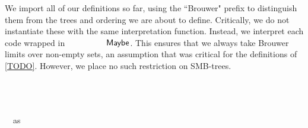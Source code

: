 We import all of our definitions so far, using the ``Brouwer" prefix to distinguish
them from the trees and ordering we are about to define.
Critically, we do not instantiate these with the same interpretation function.
Instead, we interpret each code wrapped in $\AgdaDatatype{Maybe}$.
This ensures that we always take Brouwer limits over non-empty sets,
an assumption that was critical for the definitions of \cref{TODO}.
However, we place no such restriction on SMB-trees.
\begin{code}%
\>[0]\AgdaSpace{}%
\<%
\\
\>[0][@{}l@{\AgdaIndent{0}}]%
\>[4]\<%
\\
%
\>[4]\AgdaSpace{}%
\AgdaSpace{}%
\AgdaSpace{}%
\AgdaSpace{}%
\AgdaSymbol{(}\AgdaSpace{}%
\AgdaSymbol{))}\<%
\\
%
\>[4]\AgdaSpace{}%
\AgdaSymbol{(}\AgdaSpace{}%
\AgdaSymbol{)}
\ \ as\ \<%
\end{code}


\begin{code}[hide]%
\>[0]\AgdaSpace{}%
\AgdaSpace{}%
\AgdaSpace{}%
\AgdaSpace{}%
\AgdaSpace{}%
\AgdaSpace{}%
\AgdaSpace{}%
\AgdaSpace{}%
\AgdaSymbol{(}\AgdaSpace{}%
\AgdaSymbol{))}\AgdaSpace{}%
\AgdaSpace{}%
\AgdaSymbol{(}\AgdaSpace{}%
\AgdaSymbol{)}\AgdaSpace{}%
\AgdaSpace{}%
\AgdaSpace{}%
\AgdaSpace{}%
\AgdaSymbol{)}\<%
\\
\>[0]\AgdaSpace{}%
\AgdaSpace{}%
\AgdaSpace{}%
\AgdaSpace{}%
\AgdaSpace{}%
\AgdaSpace{}%
\AgdaSpace{}%
\AgdaSpace{}%
\AgdaSymbol{(}\AgdaSpace{}%
\AgdaSymbol{))}\AgdaSpace{}%
\AgdaSpace{}%
\AgdaSymbol{(}\AgdaSpace{}%
\AgdaSymbol{)}\AgdaSpace{}%
\AgdaSpace{}%
\AgdaSpace{}%
\AgdaSpace{}%
\AgdaSymbol{)}\<%
\\
\>[0]\AgdaSpace{}%
\AgdaSpace{}%
\<%
\\
\>[0]\AgdaSpace{}%
\AgdaSpace{}%
\<%
\end{code}


